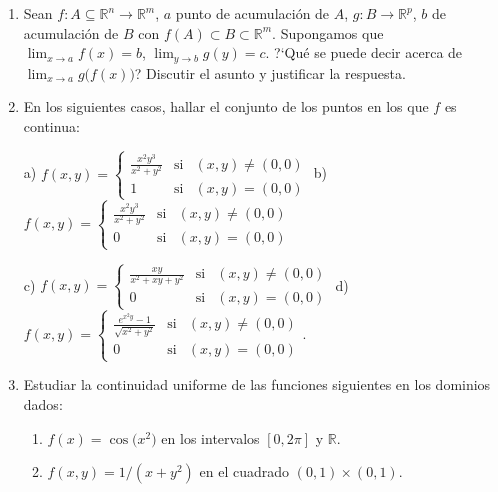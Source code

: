 \documentclass[11pt]{article}
\newcommand{\R}{\mathbb{R}}
\begin{document}
\begin{enumerate}
\item \label{bonus4-2}Sean $f:A\subseteq\R^n \longrightarrow \R^m$,
      $a$ punto de acumulaci\'on de $A$, $g: B\to\R^p$, $b$ de
      acumulaci\'on de $B$ con   
      $f(A)\subset B\subset\R^m$. Supongamos que $ \lim_{x\to
      a}f(x)=b$, $\lim_{y\to b}g(y)=c.$ 
      ?`Qu\'e  se puede decir acerca de $\lim_{x\to
      a}g\big(f(x)\big)$? Discutir el asunto y justificar la
      respuesta.         
       
      
\item En los siguientes casos, hallar el conjunto de los puntos en los que $f$ es continua:

a) $f(x,y)=\left\{ 
\begin{array}{ccc}
\frac{x^{2}y^{3}}{x^{2}+y^{2}} & \text{si} & (x,y)\neq \left( 0,0\right)  \\ 
1 & \text{si} & \left( x,y\right) =\left( 0,0\right) 
\end{array}%
\right. $ b) $f(x,y)=\left\{ 
\begin{array}{ccc}
\frac{x^{2}y^{3}}{x^{2}+y^{2}} & \text{si} & (x,y)\neq \left( 0,0\right)  \\ 
0 & \text{si} & \left( x,y\right) =\left( 0,0\right) 
\end{array}%
\right. $ 

c) $f(x,y)=\left\{ 
\begin{array}{ccc}
\frac{xy}{x^{2}+xy+y^{2}} & \text{si} & (x,y)\neq \left( 0,0\right)  \\ 
0 & \text{si} & \left( x,y\right) =\left( 0,0\right) 
\end{array}%
\right. $ d) $f(x,y)=\left\{ 
\begin{array}{ccc}
\frac{e^{x^{2}y}-1}{\sqrt{x^{2}+y^{2}}} & \text{si} & (x,y)\neq \left(
0,0\right)  \\ 
0 & \text{si} & \left( x,y\right) =\left( 0,0\right) 
\end{array}%
\right. $.

\item  Estudiar la continuidad uniforme de las funciones siguientes en
       los dominios dados: 
       \begin{enumerate}
       
       
       
       \item $f(x)=\cos\big(x^2\big)$ en los intervalos $[0,2\pi]$
                y $\R$.   
          \item $f(x,y)=1/{(x+y^2)}$ en el cuadrado $(0,1)\times
            (0,1)$. \end{enumerate}



\end{enumerate}
\end{document}
